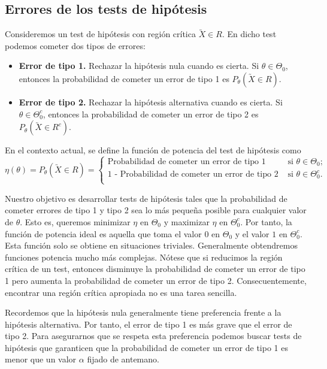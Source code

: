     \subsection{Errores de los tests de hipótesis}

        Consideremos un test de hipótesis con región crítica $\utilde{X} \in R$. En dicho test podemos cometer dos tipos de errores:

        \begin{itemize}
            \item \textbf{Error de tipo 1.} Rechazar la hipótesis nula cuando es cierta. Si $\theta \in \Theta_0$, entonces la probabilidad de cometer un error de tipo 1 es $P_\theta(\utilde{X} \in R)$.
            \item \textbf{Error de tipo 2.} Rechazar la hipótesis alternativa cuando es cierta. Si $\theta \in \Theta_0^c$, entonces la probabilidad de cometer un error de tipo 2 es $P_\theta(\utilde{X} \in R^c)$.
        \end{itemize}

        \begin{definition}
            En el contexto actual, se define la función de potencia del test de hipótesis como
            \[\eta(\theta) = P_\theta(\utilde{X} \in R) = \begin{cases} \text{Probabilidad de cometer un error de tipo 1} & \text{ si } \theta \in \Theta_0; \\ \text{1 - Probabilidad de cometer un error de tipo 2} & \text{ si } \theta \in \Theta_0^c. \\ \end{cases}\]
        \end{definition}

        Nuestro objetivo es desarrollar tests de hipótesis tales que la probabilidad de cometer errores de tipo 1 y tipo 2 sea lo más pequeña posible para cualquier valor de $\theta$. Esto es, queremos minimizar $\eta$ en $\Theta_0$ y maximizar $\eta$ en $\Theta_0^c$. Por tanto, la función de potencia ideal es aquella que toma el valor $0$ en $\Theta_0$ y el valor $1$ en $\Theta_0^c$. Esta función solo se obtiene en situaciones triviales. Generalmente obtendremos funciones potencia mucho más complejas. Nótese que si reducimos la región crítica de un test, entonces disminuye la probabilidad de cometer un error de tipo 1 pero aumenta la probabilidad de cometer un error de tipo 2. Consecuentemente, encontrar una región crítica apropiada no es una tarea sencilla.

        Recordemos que la hipótesis nula generalmente tiene preferencia frente a la hipótesis alternativa. Por tanto, el error de tipo 1 es más grave que el error de tipo 2. Para asegurarnos que se respeta esta preferencia podemos buscar tests de hipótesis que garanticen que la probabilidad de cometer un error de tipo 1 es menor que un valor $\alpha$ fijado de antemano.


